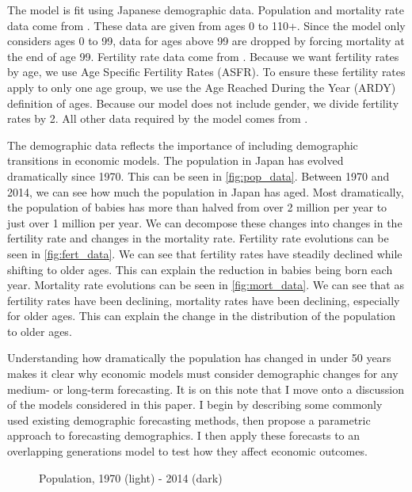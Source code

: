 \documentclass[10pt]{article}
\numberwithin{equation}{subsection}
\newcommand*{\FigureDir}{../../graphs}
\begin{document}
\par The model is fit using Japanese demographic data. Population and mortality rate data come from \cite{JMD2018}. These data are given from ages 0 to 110+. Since the model only considers ages 0 to 99, data for ages above 99 are dropped by forcing mortality at the end of age 99. Fertility rate data come from \cite{HFC2018}. Because we want fertility rates by age, we use Age Specific Fertility Rates (ASFR). To ensure these fertility rates apply to only one age group, we use the Age Reached During the Year (ARDY) definition of ages. Because our model does not include gender, we divide fertility rates by 2. All other data required by the model comes from \cite{E2020}.

\par The demographic data reflects the importance of including demographic transitions in economic models. The population in Japan has evolved dramatically since 1970. This can be seen in \autoref{fig:pop_data}. Between 1970 and 2014, we can see how much the population in Japan has aged. Most dramatically, the population of babies has more than halved from over 2 million per year to just over 1 million per year. We can decompose these changes into changes in the fertility rate and changes in the mortality rate. Fertility rate evolutions can be seen in \autoref{fig:fert_data}. We can see that fertility rates have steadily declined while shifting to older ages. This can explain the reduction in babies being born each year. Mortality rate evolutions can be seen in \autoref{fig:mort_data}. We can see that as fertility rates have been declining, mortality rates have been declining, especially for older ages. This can explain the change in the distribution of the population to older ages.

\par Understanding how dramatically the population has changed in under 50 years makes it clear why economic models must consider demographic changes for any medium- or long-term forecasting. It is on this note that I move onto a discussion of the models considered in this paper. I begin by describing some commonly used existing demographic forecasting methods, then propose a parametric approach to forecasting demographics. I then apply these forecasts to an overlapping generations model to test how they affect economic outcomes.

\begin{figure}[!ht]
   \centering
   \caption{\label{fig:pop_data}Population, 1970 (light) - 2014 (dark)}
\end{figure}
\end{document}
